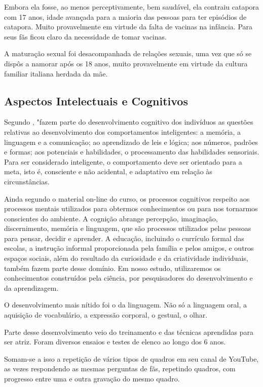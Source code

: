 Embora ela fosse, ao menos perceptivamente, bem saudável, ela contraiu catapora com 17 anos, idade avançada para a maioria das pessoas para ter episódios de catapora. Muito provavelmente em virtude da falta de vacinas na infância. Para seus fãs ficou claro da necessidade de tomar vacinas.

A maturação sexual foi desacompanhada de relações sexuais, uma vez que só se dispôs a namorar após os 18 anos, muito provavelmente em virtude da cultura familiar italiana herdada da mãe.



\subsection{Aspectos Intelectuais e Cognitivos}

Segundo , "fazem parte do desenvolvimento cognitivo dos indivíduos as questões relativas ao desenvolvimento dos comportamentos inteligentes: a memória, a linguagem e a comunicação; ao aprendizado de leis e lógica; aos números, padrões e formas; aos potenciais e habilidades, o processamento das habilidades sensoriais. Para ser considerado inteligente, o comportamento deve ser orientado para a meta, isto é, consciente e não acidental, e adaptativo em relação às circunstâncias.

Ainda segundo o material on-line do curso, os processos cognitivos respeito aos processos mentais utilizados para obtermos conhecimentos ou para nos tornarmos conscientes do ambiente. A cognição abrange percepção, imaginação, discernimento, memória e linguagem, que são processos utilizados pelas pessoas para pensar, decidir e aprender.  A educação, incluindo o currículo formal das escolas, a instrução informal proporcionada pela família e pelos amigos, e outros espaços sociais, além do resultado da curiosidade e da criatividade individuais, também fazem parte desse domínio.
Em nosso estudo, utilizaremos os conhecimentos construídos pela ciência, por pesquisadores do desenvolvimento e da aprendizagem.

O desenvolvimento mais nítido foi o da linguagem. Não só a linguagem oral, a aquisição de vocabulário, a expressão corporal, o gestual, o olhar.

Parte desse desenvolvimento veio do treinamento e das técnicas aprendidas para ser atriz. Foram diversos ensaios e testes de elenco ao longo dos 6 anos.

Somam-se a isso a repetição de vários tipos de quadros em seu canal de YouTube, as vezes respondendo as mesmas perguntas de fãs, repetindo quadros, com progresso entre uma e outra gravação do mesmo quadro.


